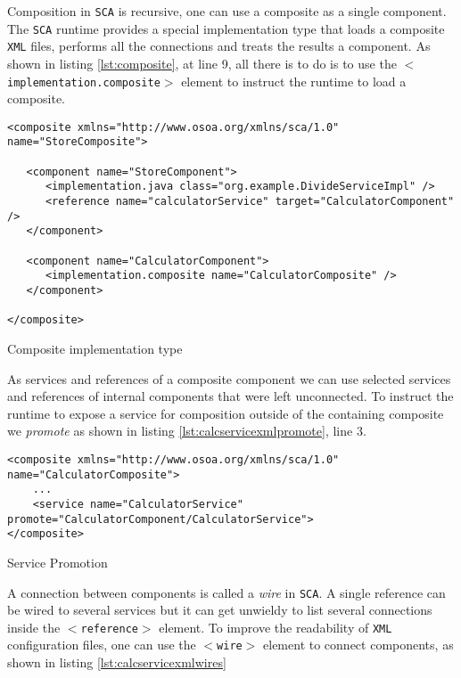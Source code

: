 Composition in \texttt{SCA} is recursive, one can use a composite as a single component. The \texttt{SCA} runtime provides a special implementation
type that loads a composite \texttt{XML} files, performs all the connections and treats the results a component. As shown in listing
\ref{lst:composite}, at line 9, all there is to do is to use the \texttt{$<$implementation.composite$>$} element to instruct the runtime
to load a composite.

\begin{listing}
\begin{verbatim}
<composite xmlns="http://www.osoa.org/xmlns/sca/1.0" name="StoreComposite">

   <component name="StoreComponent">
      <implementation.java class="org.example.DivideServiceImpl" />
      <reference name="calculatorService" target="CalculatorComponent" />
   </component>

   <component name="CalculatorComponent">
      <implementation.composite name="CalculatorComposite" />
   </component>

</composite>
\end{verbatim}
\caption{Composite implementation type}
\label{lst:composite}
\end{listing}

As services and references of a composite component we can use selected services and references of internal components
that were left unconnected. To instruct the runtime to expose a service for composition outside of the containing composite
we \emph{promote} as shown in listing \ref{lst:calcservicexmlpromote}, line 3.

\begin{listing}
\begin{verbatim}
<composite xmlns="http://www.osoa.org/xmlns/sca/1.0" name="CalculatorComposite">
    ...
    <service name="CalculatorService" promote="CalculatorComponent/CalculatorService">
</composite>
\end{verbatim}
\caption{Service Promotion}
\label{lst:calcservicexmlpromote}
\end{listing}

A connection between components is called a \emph{wire} in \texttt{SCA}. A single reference can be wired to several services
but it can get unwieldy to list several connections inside the \texttt{$<$reference$>$} element. To improve the readability
of \texttt{XML} configuration files, one can use the \texttt{$<$wire$>$} element to connect components, as shown in listing 
\ref{lst:calcservicexmlwires}

